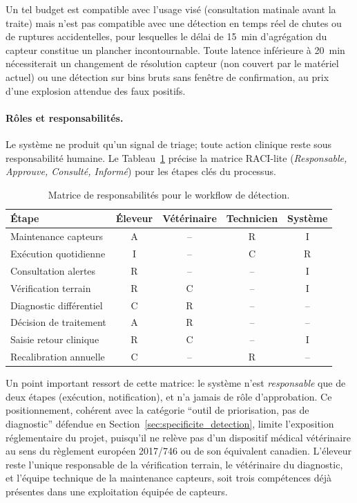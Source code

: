 Un tel budget est compatible avec l'usage visé (consultation matinale avant
la traite) mais n'est pas compatible avec une détection en temps réel
de chutes ou de ruptures accidentelles, pour lesquelles le délai de
15~min d'agrégation du capteur constitue un plancher incontournable.
Toute latence inférieure à 20~min nécessiterait un changement de
résolution capteur (non couvert par le matériel actuel) ou une
détection sur bins bruts sans fenêtre de confirmation, au prix d'une
explosion attendue des faux positifs.

\paragraph{Rôles et responsabilités.}
Le système ne produit qu'un signal de triage; toute action clinique
reste sous responsabilité humaine. Le
Tableau~\ref{tab:raci_workflow} précise la matrice RACI-lite
(\emph{Responsable, Approuve, Consulté, Informé}) pour les étapes
clés du processus.

\begin{table}[H]
    \centering
    \small
    \caption{Matrice de responsabilités pour le workflow de détection.}
    \label{tab:raci_workflow}
    \begin{tabular}{p{4.6cm}cccc}
        \toprule
        \textbf{Étape} & \textbf{Éleveur} & \textbf{Vétérinaire}
            & \textbf{Technicien} & \textbf{Système} \\
        \midrule
        Maintenance capteurs        & A & -- & R & I \\
        Exécution quotidienne       & I & -- & C & R \\
        Consultation alertes        & R & -- & -- & I \\
        Vérification terrain        & R & C  & -- & I \\
        Diagnostic différentiel     & C & R  & -- & -- \\
        Décision de traitement      & A & R  & -- & -- \\
        Saisie retour clinique      & R & C  & -- & I \\
        Recalibration annuelle      & C & -- & R & -- \\
        \bottomrule
    \end{tabular}
\end{table}

Un point important ressort de cette matrice: le système n'est
\emph{responsable} que de deux étapes (exécution, notification), et
n'a jamais de rôle d'approbation. Ce positionnement, cohérent avec
la catégorie ``outil de priorisation, pas de diagnostic'' défendue en
Section~\ref{sec:specificite_detection}, limite l'exposition
réglementaire du projet, puisqu'il ne relève pas d'un dispositif
médical vétérinaire au sens du règlement européen 2017/746 ou de son
équivalent canadien. L'éleveur reste l'unique responsable de la
vérification terrain, le vétérinaire du diagnostic, et l'équipe
technique de la maintenance capteurs, soit trois compétences déjà
présentes dans une exploitation équipée de capteurs.

